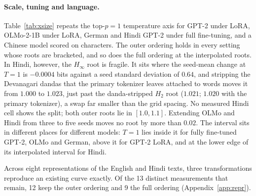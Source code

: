 \documentclass[10pt]{article}
\theoremstyle{plain}
\theoremstyle{definition}
\newcommand{\Htwo}{H_2}
\newcommand{\Hinf}{H_\infty}
\begin{document}
\paragraph{Scale, tuning and language.} Table~\ref{tab:xsize} repeats the top-$p=1$ temperature
axis for GPT-2 under LoRA, OLMo-2-1B under LoRA, German and Hindi GPT-2 under full fine-tuning,
and a Chinese model scored on characters. The outer ordering holds in every setting whose roots
are bracketed, and so does the full ordering at the interpolated roots. In Hindi, however, the
$\Hinf$ root is fragile. It sits where the seed-mean change at $T=1$ is $-0.0004$ bits against a
seed standard deviation of $0.64$, and stripping the Devanagari dandas that the primary tokenizer
leaves attached to words moves it from $1.000$ to $1.023$, just past the danda-stripped $\Htwo$ root ($1.021$; $1.020$ with the primary tokenizer),
a swap far smaller than the grid spacing. No measured Hindi cell shows the split; both outer
roots lie in $[1.0,1.1]$. Extending OLMo and Hindi from three to five seeds moves no
root by more than $0.02$. The interval sits in different places for different models: $T=1$ lies
inside it for fully fine-tuned GPT-2, OLMo and German, above it for GPT-2 LoRA, and at the lower
edge of its interpolated interval for Hindi.

Across eight representations of the English and Hindi texts, three transformations reproduce an
existing curve exactly. Of the 13 distinct measurements that remain, 12 keep the outer ordering
and 9 the full ordering (Appendix~\ref{app:repr}).
\end{document}
